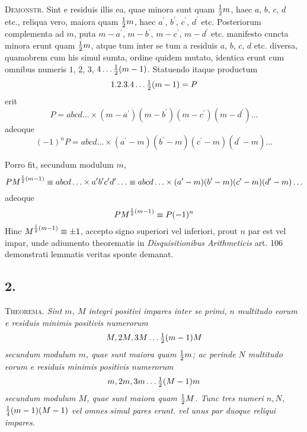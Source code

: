 \documentclass[twoside,12pt, showframe]{memoir}
\let\oldfrac\frac
\def\frac#1#2{\mathchoice{\tfrac{#1}{#2}}{\oldfrac{#1}{#2}}{\genfrac{}{}{}{2}{#1}{#2\mathstrut}}{\genfrac{}{}{}{3}{#1}{#2\mathstrut}}}
\begin{document}
\textsc{Demonstr.} Sint e residuis illis ea, quae minora sunt quam \(\frac{1}{2} m\), haec \(a\), \(b\), \(c\), \(d\) etc., reliqua vero, maiora quam \(\frac{1}{2} m\), haec \(a^{\prime}\), \(b^{\prime}\), \(c^{\prime}\), \(d^{\prime}\) etc. Posteriorum complementa ad \(m\), puta \(m-a^{\prime}\), \(m-b^{\prime}\), \(m-c^{\prime}\), \(m-d^{\prime}\) etc. manifesto cuncta minora erunt quam \(\frac{1}{2} m\), atque tum inter se tum a residuis \(a\), \(b\), \(c\), \(d\) etc. diversa, quamobrem cum his simul sumta, ordine quidem mutato, identica erunt cum omnibus numeris \(1\), \(2\), \(3\), \(4 \ldots \frac{1}{2}(m-1)\). Statuendo itaque productum
\[1. 2 . 3 . 4 \ldots \frac{1}{2}(m-1)=P\]
erit
\[P=a b c d \ldots \times(m-a^{\prime})(m-b^{\prime})(m-c^{\prime})(m-d^{\prime}) \ldots\]
adeoque
\[(-1)^{n} P=a b c d \ldots \times(a^{\prime}-m)(b^{\prime}-m)(c^{\prime}-m)(d^{\prime}-m) \ldots\]

Porro fit, secundum modulum \(m\),
\[P M^{\frac{1}{2}(m-1)} \equiv a b c d \ldots \times a^{\prime} b^{\prime} c^{\prime} d^{\prime} \ldots \equiv a b c d \ldots \times(a^{\prime}-m)(b^{\prime}-m)(c^{\prime}-m)(d^{\prime}-m) \ldots\]
adeoque
\[P M^{\frac{1}{2}(m-1)} \equiv P(-1)^{n}\]
Hinc \(M^{\frac{1}{2}(m-1)} \equiv \pm 1\), accepto signo superiori vel inferiori, prout \(n\) par est vel impar, unde adiumento theorematis in \textit{Disquisitionibus Arithmeticis} art. 106 demonstrati lemmatis veritas sponte demanat.\clearpage\noindent%

\subsection*{2.}
 
\textsc{Theorema.} \textit{Sint \(m\), \(M\) integri positivi impares inter se primi, \(n\) multitudo eorum e residuis minimis positivis numerorum}
\[M, 2 M, 3 M \ldots  \frac{1}{2}(m-1) M\]
\textit{secundum modulum \(m\), quae sunt maiora quam \(\frac{1}{2} m\); ac perinde \(N\) multitudo eorum e residuis minimis positivis numerorum}
\[m, 2 m, 3 m \ldots \frac{1}{2}(M-1) m\]
\textit{secundum modulum \(M\), quae sunt maiora quam \(\frac{1}{2} M\). Tunc tres numeri \(n, N\), \(\frac{1}{4}(m-1)(M-1)\) vel omnes simul pares erunt. vel unus par duoque reliqui impares.}
 
\end{document}
